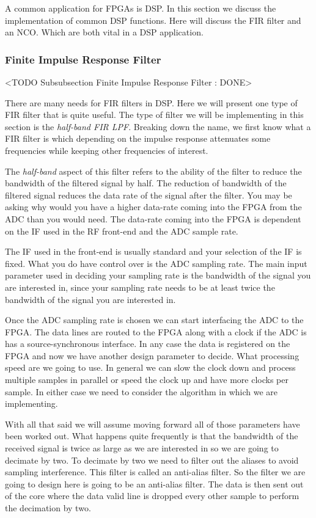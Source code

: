 A common application for \ac{FPGA}s is \ac{DSP}. In this section we discuss the implementation of common \ac{DSP} functions. Here will discuss the \ac{FIR} filter and an \ac{NCO}. Which are both vital in a \ac{DSP} application. 

\subsubsection{Finite Impulse Response Filter}
	<TODO Subsubsection  Finite Impulse Response Filter : DONE>

There are many needs for \ac{FIR} filters in \ac{DSP}. Here we will present one type of \ac{FIR} filter that is quite useful. The type of filter we will be implementing in this section is the \emph{half-band \ac{FIR} \ac{LPF}}. Breaking down the name, we first know what a \ac{FIR} filter is which depending on the impulse response attenuates some frequencies while keeping other frequencies of interest. 

The \emph{half-band} aspect of this filter refers to the ability of the filter to reduce the bandwidth of the filtered signal by half. The reduction of bandwidth of the filtered signal reduces the data rate of the signal after the filter. You may be asking why would you have a higher data-rate coming into the \ac{FPGA} from the \ac{ADC} than you would need. The data-rate coming into the \ac{FPGA} is dependent on the \ac{IF} used in the \ac{RF} front-end and the \ac{ADC} sample rate. 

The \ac{IF} used in the front-end is usually standard and your selection of the \ac{IF} is fixed. What you do have control over is the \ac{ADC} sampling rate. The main input parameter used in deciding your sampling rate is the bandwidth of the signal you are interested in, since your sampling rate needs to be at least twice the bandwidth of the signal you are interested in. 

Once the \ac{ADC} sampling rate is chosen we can start interfacing the \ac{ADC} to the \ac{FPGA}. The data lines are routed to the \ac{FPGA} along with a clock if the \ac{ADC} is has a source-synchronous interface. In any case the data is registered on the \ac{FPGA} and now we have another design parameter to decide. What processing speed are we going to use. In general we can slow the clock down and process multiple samples in parallel or speed the clock up and have more clocks per sample. In either case we need to consider the algorithm in which we are implementing. 

With all that said we will assume moving forward all of those parameters have been worked out. What happens quite frequently is that the bandwidth of the received signal is twice as large as we are interested in so we are going to decimate by two. To decimate by two we need to filter out the aliases to avoid sampling interference. This filter is called an anti-alias filter. So the filter we are going to design here is going to be an anti-alias filter. The data is then sent out of the core where the data valid line is dropped every other sample to perform the decimation by two. 


